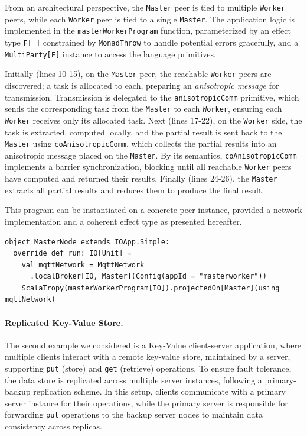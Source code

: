 \documentclass[runningheads]{llncs}
\newcommand{\code}[1]{\lstinline[style=scala3,basicstyle=\ttfamily\small\color{vscLightText}]{#1}}
\begin{document}
From an architectural perspective, 
the \code{Master} peer is tied to multiple \code{Worker} peers,
  while each \code{Worker} peer is tied to a single \code{Master}.
%
%
The application logic is implemented in the \code{masterWorkerProgram} function,
parameterized by an effect type \code{F[_]} constrained by \code{MonadThrow} to handle potential errors gracefully,
and a \code{MultiParty[F]} instance to access the language primitives.

Initially (lines 10-15), 
on the \code{Master} peer,
the reachable \code{Worker} peers are discovered;
%
a task is allocated to each, preparing an \emph{anisotropic message} for transmission.
%
Transmission is delegated to the \code{anisotropicComm} primitive,
which sends the corresponding task from the \code{Master} to each \code{Worker},
ensuring each \code{Worker} receives only its allocated task.
%
Next (lines 17-22),
on the \code{Worker} side,
the task is extracted, 
computed locally,
and the partial result is sent back to the \code{Master} using \code{coAnisotropicComm},
which collects the partial results into an anisotropic message placed on the \code{Master}.
%
By its semantics, \code{coAnisotropicComm} implements a barrier synchronization, blocking until all reachable \code{Worker} peers have computed and returned their results.
%
Finally (lines 24-26), the \code{Master} extracts all partial results and reduces them to produce the final result.

This program can be instantiated on a concrete peer instance, 
provided a network implementation and a coherent effect type as presented hereafter.

\begin{lstlisting}[style=scala3]
object MasterNode extends IOApp.Simple:
  override def run: IO[Unit] =
    val mqttNetwork = MqttNetwork
      .localBroker[IO, Master](Config(appId = "masterworker"))
    ScalaTropy(masterWorkerProgram[IO]).projectedOn[Master](using mqttNetwork)
\end{lstlisting}

\paragraph{Replicated Key-Value Store.}

The second example we considered is a Key-Value client-server application, where multiple clients interact with a remote key-value store, maintained by a server, supporting \code{put} (store) and \code{get} (retrieve) operations.
%
To ensure fault tolerance, the data store is replicated across multiple server instances, following a primary-backup replication scheme.
%
In this setup, clients communicate with a primary server instance for their operations, while the primary server is responsible for forwarding \code{put} operations to the backup server nodes to maintain data consistency across replicas.
\end{document}
